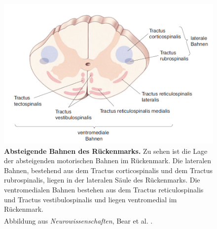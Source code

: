 \begin{figure}[H]
    \centering
    \includegraphics[width=1\textwidth]{pictures/Bilder_Laura/absteigende_bahnen_rkm.png}
    \caption[Absteigende Bahnen des Rückenmarks]{\textbf{Absteigende Bahnen des Rückenmarks.} Zu sehen ist die Lage der absteigenden motorischen Bahnen im Rückenmark. Die lateralen Bahnen, bestehend aus dem Tractus corticospinalis und dem Tractus rubrospinalis, liegen in der lateralen Säule des Rückenmarks. Die ventromedialen Bahnen bestehen aus dem Tractus reticulospinalis und Tractus vestibulospinalis und liegen ventromedial im Rückenmark. \\
    Abbildung aus \textit{Neurowissenschaften}, Bear et al. \textsuperscript{\cite[14]{neurowissenschaften_baer}}.}
    \label{fig:abst_Rueckenmark}
\end{figure}


